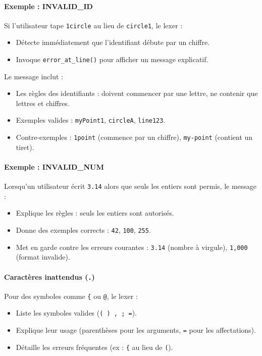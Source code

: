 \documentclass[12pt,a4paper]{article}
\begin{document}
\paragraph*{Exemple : INVALID\_ID}
Si l’utilisateur tape \texttt{1circle} au lieu de \texttt{circle1}, le lexer :
\begin{itemize}
    \item Détecte immédiatement que l’identifiant débute par un chiffre.
    \item Invoque \texttt{error\_at\_line()} pour afficher un message explicatif.
\end{itemize}
Le message inclut :
\begin{itemize}
    \item Les règles des identifiants : doivent commencer par une lettre, ne contenir que lettres et chiffres.
    \item Exemples valides : \texttt{myPoint1}, \texttt{circleA}, \texttt{line123}.
    \item Contre-exemples : \texttt{1point} (commence par un chiffre), \texttt{my-point} (contient un tiret).
\end{itemize}

\paragraph*{Exemple : INVALID\_NUM}
Lorsqu’un utilisateur écrit \texttt{3.14} alors que seuls les entiers sont permis, le message :
\begin{itemize}
    \item Explique les règles : seuls les entiers sont autorisés.
    \item Donne des exemples corrects : \texttt{42}, \texttt{100}, \texttt{255}.
    \item Met en garde contre les erreurs courantes : \texttt{3.14} (nombre à virgule), \texttt{1,000} (format invalide).
\end{itemize}

\paragraph*{Caractères inattendus (\texttt{.})}
Pour des symboles comme \texttt{\{} ou \texttt{@}, le lexer :
\begin{itemize}
    \item Liste les symboles valides (\texttt{( ) , ; =}).
    \item Explique leur usage (parenthèses pour les arguments, \texttt{=} pour les affectations).
    \item Détaille les erreurs fréquentes (ex : \texttt{\{} au lieu de \texttt{(}).
\end{itemize}
\end{document}
